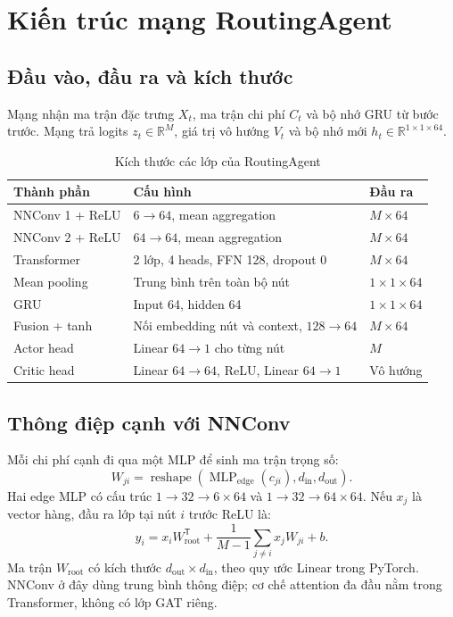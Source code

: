 \documentclass[12pt,a4paper,oneside]{report}
\begin{document}
\chapter{Kiến trúc mạng RoutingAgent}
\section{Đầu vào, đầu ra và kích thước}
Mạng nhận ma trận đặc trưng $X_t$, ma trận chi phí $C_t$ và bộ nhớ GRU
từ bước trước. Mạng trả logits $z_t\in\mathbb R^M$, giá trị vô hướng
$V_t$ và bộ nhớ mới $h_t\in\mathbb R^{1\times1\times64}$.

\begin{table}[htbp]
\centering\small
\caption{Kích thước các lớp của RoutingAgent}
\begin{tabularx}{\textwidth}{@{}lYl@{}}
\toprule
Thành phần & Cấu hình & Đầu ra \\
\midrule
NNConv 1 + ReLU & $6\rightarrow64$, mean aggregation & $M\times64$\\
NNConv 2 + ReLU & $64\rightarrow64$, mean aggregation & $M\times64$\\
Transformer & 2 lớp, 4 heads, FFN 128, dropout 0 & $M\times64$\\
Mean pooling & Trung bình trên toàn bộ nút & $1\times1\times64$\\
GRU & Input 64, hidden 64 & $1\times1\times64$\\
Fusion + tanh & Nối embedding nút và context, $128\rightarrow64$ & $M\times64$\\
Actor head & Linear $64\rightarrow1$ cho từng nút & $M$\\
Critic head & Linear $64\rightarrow64$, ReLU, Linear $64\rightarrow1$ & Vô hướng\\
\bottomrule
\end{tabularx}
\end{table}

\section{Thông điệp cạnh với NNConv}
Mỗi chi phí cạnh đi qua một MLP để sinh ma trận trọng số:
\begin{equation}
W_{ji}=\operatorname{reshape}\left(
\operatorname{MLP}_{\mathrm{edge}}(c_{ji}),d_{\mathrm{in}},d_{\mathrm{out}}
\right).
\end{equation}
Hai edge MLP có cấu trúc $1\rightarrow32\rightarrow6\times64$ và
$1\rightarrow32\rightarrow64\times64$. Nếu $x_j$ là vector hàng,
đầu ra lớp tại nút $i$ trước ReLU là:
\begin{equation}
y_i=x_iW_{\mathrm{root}}^{\mathsf T}+
\frac{1}{M-1}\sum_{j\ne i}x_jW_{ji}+b.
\end{equation}
Ma trận $W_{\mathrm{root}}$ có kích thước
$d_{\mathrm{out}}\times d_{\mathrm{in}}$, theo quy ước Linear trong
PyTorch. NNConv ở đây dùng trung bình thông điệp; cơ chế attention
đa đầu nằm trong Transformer, không có lớp GAT riêng.
\end{document}
